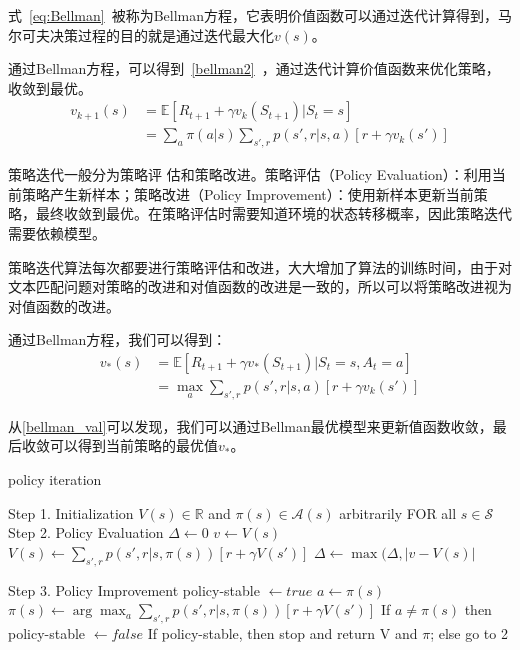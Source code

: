 式~\eqref{eq:Bellman}~被称为Bellman方程\cite{bellman1957markovian}，它表明价值函数可以通过迭代计算得到，马尔可夫决策过程的目的就是通过迭代最大化$v(s)$。

通过Bellman方程，可以得到~\eqref{bellman2}~，通过迭代计算价值函数来优化策略，收敛到最优。
\begin{equation}\label{bellman2}
\begin{aligned}
v_{k+1}(s) &= \mathbb{E}[R_{t+1}+\gamma v_k(S_{t+1})|S_t=s]\\
		   &= \sum_a \pi(a|s) \sum_{s',r}p(s',r|s,a)[r+\gamma v_k(s')]
\end{aligned}
\end{equation}

策略迭代一般分为策略评 估和策略改进。策略评估（Policy Evaluation）：利用当前策略产生新样本；策略改进（Policy Improvement）：使用新样本更新当前策略，最终收敛到最优。在策略评估时需要知道环境的状态转移概率，因此策略迭代需要依赖模型。

策略迭代算法每次都要进行策略评估和改进，大大增加了算法的训练时间，由于对文本匹配问题对策略的改进和对值函数的改进是一致的，所以可以将策略改进视为对值函数的改进。

通过Bellman方程，我们可以得到：
\begin{equation}\label{bellman_val}
	\begin{aligned}
		v_*(s) &= \mathbb{E}[R_{t+1}+\gamma v_*(S_{t+1})|S_t=s,A_t=a] \\
			   &= \max_a \sum_{s',r}p(s', r|s, a)[r+\gamma v_k(s')]
	\end{aligned}
\end{equation}

从\eqref{bellman_val}可以发现，我们可以通过Bellman最优模型来更新值函数收敛，最后收敛可以得到当前策略的最优值$v_*$。

\begin{algorithm}[H]
    \small
    \caption{policy iteration}\label{alg:policy_iteration}
    \begin{algorithmic}
        \STATE Step 1. Initialization
        	\STATE $V(s) \in \mathbb{R}$ and $\pi(s) \in \mathcal{A}(s)$ arbitrarily FOR all $s \in \mathcal{S}$
        \STATE Step 2. Policy Evaluation
        \REPEAT
        \STATE $\Delta \leftarrow 0$
        \STATE $v \leftarrow V(s)$
        \STATE $V(s)\leftarrow \sum_{s', r} p(s', r|s, \pi(s))[r + \gamma V(s')]$
        \STATE $\Delta \leftarrow \max(\Delta, |v-V(s)|$
        \ENDFOR

        \UNTIL{$\Delta < \theta$}

        \STATE Step 3. Policy Improvement
        \STATE policy-stable $\leftarrow  true$
        \STATE $a \leftarrow \pi(s)$
        \STATE $\pi(s) \leftarrow \arg\max_a\sum_{s', r}p(s', r|s, \pi(s))[r + \gamma V(s')]$
        \STATE If $a \neq \pi(s)$ then policy-stable $\leftarrow  false$
        \ENDFOR
        \STATE If policy-stable, then stop and return V and $\pi$; else go to 2
    \end{algorithmic}
\end{algorithm}



